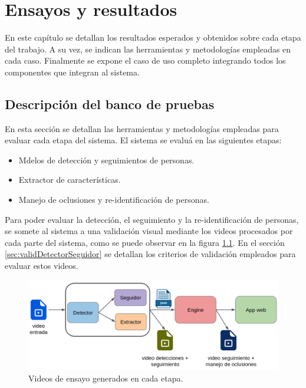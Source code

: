 
\chapter{Ensayos y resultados} %

\label{Chapter4} %

En este capítulo se detallan los resultados esperados y obtenidos sobre cada etapa del trabajo. A su vez, se indican las herramientas y metodologías empleadas en cada caso. Finalmente se expone el caso de uso completo integrando todos los componentes que integran al sistema.


\section{Descripción del banco de pruebas}
\label{sec:bancoPruebas}

En esta sección se detallan las herramientas y metodologías empleadas para evaluar cada etapa del sistema. 
El sistema se evaluá en las siguientes etapas:

\begin{itemize}
\item Mdelos de detección y seguimientos de personas.
\item Extractor de características.
\item Manejo de oclusiones y re-identificación de personas.
\end{itemize}

Para poder evaluar la detección, el seguimiento y la re-identificación de personas, se somete al sistema a una validación visual mediante los videos procesados por cada parte del sistema, como se puede observar en la figura \ref{fig:bancoPruebas}. En el sección \ref{sec:validDetectorSeguidor} se detallan los criterios de validación empleados para evaluar estos videos.

\begin{figure}[ht]
	\centering
	\includegraphics[scale=.50]{./Figures/bancoPruebas.png}
	\caption{Videos de ensayo generados en cada etapa.}
	\label{fig:bancoPruebas}
\end{figure}



